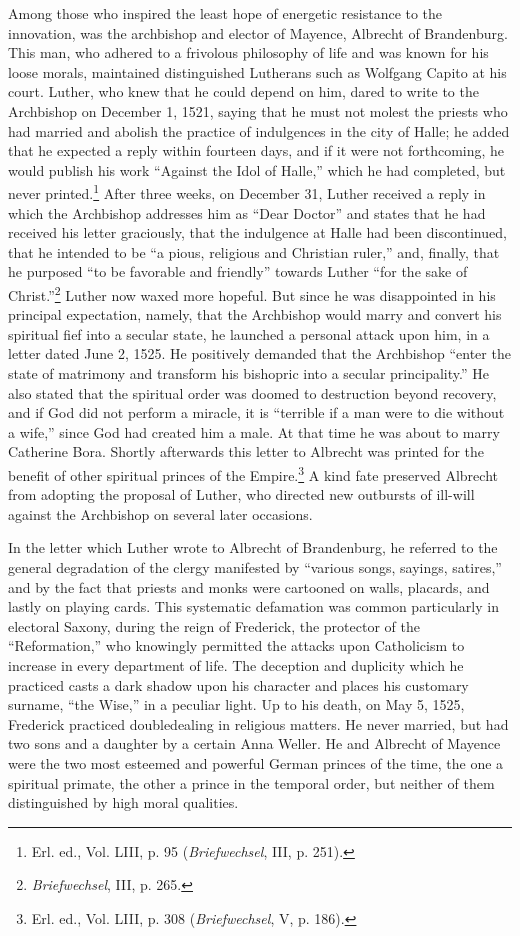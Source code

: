 Among those who inspired the least hope of energetic resistance
to the innovation, was the archbishop and elector of Mayence,
Albrecht of Brandenburg. This man, who adhered to a frivolous
philosophy of life and was known for his loose morals, maintained
distinguished Lutherans such as Wolfgang Capito at his court.
Luther, who knew that he could depend on him, dared to write to
the Archbishop on December 1, 1521, saying that he must not molest
the priests who had married and abolish the practice of indulgences
in the city of Halle; he added that he expected a reply within
fourteen days, and if it were not forthcoming, he would publish
his work “Against the Idol of Halle,” which he had completed, but
never printed.\footnote{Erl. ed., Vol. LIII, p. 95 (\textit{Briefwechsel}, III, p. 251).}
After three weeks, on December 31, Luther received
a reply in which the Archbishop addresses him as “Dear Doctor”
and states that he had received his letter graciously, that the indulgence
at Halle had been discontinued, that he intended to be
“a pious, religious and Christian ruler,” and, finally, that he purposed
“to be favorable and friendly” towards Luther “for the sake
of Christ.”\footnote{\textit{Briefwechsel}, III, p. 265.}
Luther now waxed more hopeful. But since he was
disappointed in his principal expectation, namely, that the Archbishop
would marry and convert his spiritual fief into a secular
state, he launched a personal attack upon him, in a letter dated June
2, 1525. He positively demanded that the Archbishop “enter the state
of matrimony and transform his bishopric into a secular principality.”
He also stated that the spiritual order was doomed to destruction beyond
recovery, and if God did not perform a miracle,
it is “terrible if a man were to die without a wife,” since God had
created him a male. At that time he was about to marry Catherine
Bora. Shortly afterwards this letter to Albrecht was printed for the
benefit of other spiritual princes of the Empire.\footnote
{Erl. ed., Vol. LIII, p. 308 (\textit{Briefwechsel}, V, p. 186).}
A kind fate preserved
Albrecht from adopting the proposal of Luther, who directed
new outbursts of ill-will against the Archbishop on several later
occasions.

In the letter which Luther wrote to Albrecht of Brandenburg,
he referred to the general degradation of the clergy manifested by
“various songs, sayings, satires,” and by the fact that priests and
monks were cartooned on walls, placards, and lastly on playing
cards. This systematic defamation was common particularly in electoral
Saxony, during the reign of Frederick, the protector of the
“Reformation,” who knowingly permitted the attacks upon Catholicism
to increase in every department of life. The deception and
duplicity which he practiced casts a dark shadow upon his character
and places his customary surname, “the Wise,” in a peculiar light.
Up to his death, on May 5, 1525, Frederick practiced doubledealing
in religious matters. He never married, but had two sons and
a daughter by a certain Anna Weller. He and Albrecht of Mayence
were the two most esteemed and powerful German princes of the
time, the one a spiritual primate, the other a prince in the temporal
order, but neither of them distinguished by high moral qualities.

